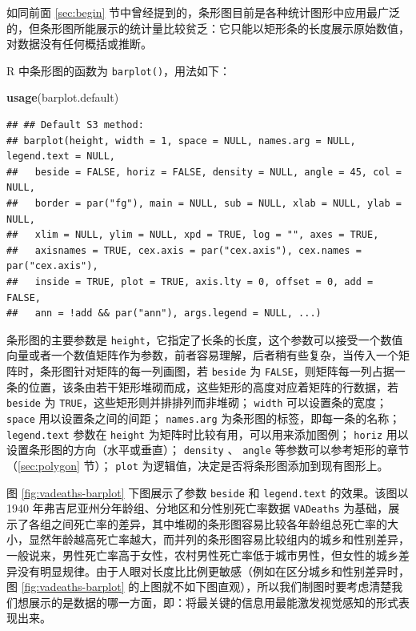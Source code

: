 \documentclass[
  b5paper,
  UTF8,twoside]{book}
\newenvironment{Shaded}{\begin{snugshade}}{\end{snugshade}}
\newcommand{\FunctionTok}[1]{\textcolor[rgb]{0.13,0.29,0.53}{\textbf{#1}}}
\newcommand{\NormalTok}[1]{#1}
\begin{document}
如同前面 \ref{sec:begin} 节中曾经提到的，条形图目前是各种统计图形中应用最广泛的，但条形图所能展示的统计量比较贫乏：它只能以矩形条的长度展示原始数值，对数据没有任何概括或推断。

R 中条形图的函数为 \texttt{barplot()}，用法如下：

\begin{Shaded}
\begin{Highlighting}[]
\FunctionTok{usage}\NormalTok{(barplot.default)}
\end{Highlighting}
\end{Shaded}

\begin{verbatim}
## ## Default S3 method:
## barplot(height, width = 1, space = NULL, names.arg = NULL, legend.text = NULL,
##   beside = FALSE, horiz = FALSE, density = NULL, angle = 45, col = NULL,
##   border = par("fg"), main = NULL, sub = NULL, xlab = NULL, ylab = NULL,
##   xlim = NULL, ylim = NULL, xpd = TRUE, log = "", axes = TRUE,
##   axisnames = TRUE, cex.axis = par("cex.axis"), cex.names = par("cex.axis"),
##   inside = TRUE, plot = TRUE, axis.lty = 0, offset = 0, add = FALSE,
##   ann = !add && par("ann"), args.legend = NULL, ...)
\end{verbatim}

条形图的主要参数是 \texttt{height}，它指定了长条的长度，这个参数可以接受一个数值向量或者一个数值矩阵作为参数，前者容易理解，后者稍有些复杂，当传入一个矩阵时，条形图针对矩阵的每一列画图，若 \texttt{beside} 为 \texttt{FALSE}，则矩阵每一列占据一条的位置，该条由若干矩形堆砌而成，这些矩形的高度对应着矩阵的行数据，若 \texttt{beside} 为 \texttt{TRUE}，这些矩形则并排排列而非堆砌； \texttt{width} 可以设置条的宽度； \texttt{space} 用以设置条之间的间距； \texttt{names.arg} 为条形图的标签，即每一条的名称； \texttt{legend.text} 参数在 \texttt{height} 为矩阵时比较有用，可以用来添加图例； \texttt{horiz} 用以设置条形图的方向（水平或垂直）； \texttt{density} 、 \texttt{angle} 等参数可以参考矩形的章节（\ref{sec:polygon} 节）； \texttt{plot} 为逻辑值，决定是否将条形图添加到现有图形上。

图 \ref{fig:vadeaths-barplot}
下图展示了参数 \texttt{beside} 和 \texttt{legend.text} 的效果。该图以 1940 年弗吉尼亚州分年龄组、分地区和分性别死亡率数据 \texttt{VADeaths} 为基础，展示了各组之间死亡率的差异，其中堆砌的条形图容易比较各年龄组总死亡率的大小，显然年龄越高死亡率越大，而并列的条形图容易比较组内的城乡和性别差异，一般说来，男性死亡率高于女性，农村男性死亡率低于城市男性，但女性的城乡差异没有明显规律。由于人眼对长度比比例更敏感（例如在区分城乡和性别差异时，图 \ref{fig:vadeaths-barplot}
的上图就不如下图直观），所以我们制图时要考虑清楚我们想展示的是数据的哪一方面，即：将最关键的信息用最能激发视觉感知的形式表现出来。
\end{document}
